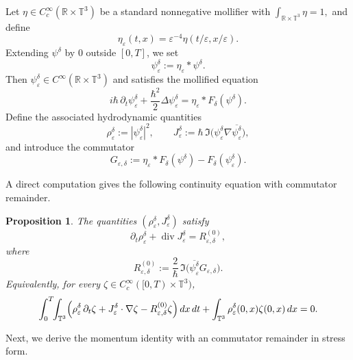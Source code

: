 \documentclass[11pt]{article}
\newtheorem{proposition}{Proposition}
\begin{document}
Let \(\eta\in C_c^\infty(\mathbb{R}\times \mathbb{T}^3)\) be a standard nonnegative mollifier with
$
\int_{\mathbb{R}\times\mathbb{T}^3}\eta=1,$
and define
\[
\eta_\varepsilon(t,x)=\varepsilon^{-4}\eta(t/\varepsilon,x/\varepsilon).
\]
Extending \(\psi^\delta\) by \(0\) outside \([0,T]\), we set
\[
\psi^\delta_\varepsilon:=\eta_\varepsilon * \psi^\delta.
\]
Then \(\psi^\delta_\varepsilon\in C^\infty(\mathbb{R}\times\mathbb{T}^3)\) and satisfies the mollified equation
\begin{equation}\label{eq:moll-eq-rig}
i\hbar\,\partial_t\psi^\delta_\varepsilon+\frac{\hbar^2}{2}\Delta\psi^\delta_\varepsilon
=
\eta_\varepsilon * F_\delta(\psi^\delta).
\end{equation}
Define the associated hydrodynamic quantities
\[
\rho^\delta_\varepsilon:=|\psi^\delta_\varepsilon|^2,
\qquad
J^\delta_\varepsilon:=\hbar\,\Im\!\bigl(\psi^\delta_\varepsilon\nabla\overline{\psi^\delta_\varepsilon}\bigr),
\]
and introduce the commutator
\begin{equation}\label{eq:Gepsdelta-rig}
G_{\varepsilon,\delta}
:=
\eta_\varepsilon * F_\delta(\psi^\delta)-F_\delta(\psi^\delta_\varepsilon).
\end{equation}


\medskip


A direct computation gives the following continuity equation with commutator remainder.


\begin{proposition}\label{prop:continuity-eps-delta}
The quantities \((\rho^\delta_\varepsilon,J^\delta_\varepsilon)\) satisfy
\[
\partial_t\rho^\delta_\varepsilon+\operatorname{div}J^\delta_\varepsilon
=
R_{\varepsilon,\delta}^{(0)},
\]
where
\[
R_{\varepsilon,\delta}^{(0)}
:=
\frac{2}{\hbar}\,\Im\!\bigl(\overline{\psi^\delta_\varepsilon}G_{\varepsilon,\delta}\bigr).
\]
Equivalently, for every \(\zeta\in C_c^\infty([0,T)\times\mathbb{T}^3)\),
\begin{equation}\label{eq:weak-with-R0}
\int_0^T\!\!\int_{\mathbb{T}^3}
\Bigl(
\rho^\delta_\varepsilon\,\partial_t\zeta
+
J^\delta_\varepsilon\cdot\nabla\zeta
-
R^{(0)}_{\varepsilon,\delta}\zeta
\Bigr)\,dx\,dt
+
\int_{\mathbb{T}^3}\rho^\delta_\varepsilon(0,x)\zeta(0,x)\,dx
=
0.
\end{equation}
\end{proposition}


\medskip



Next, we derive the momentum identity with an commutator remainder in stress form.
\end{document}
